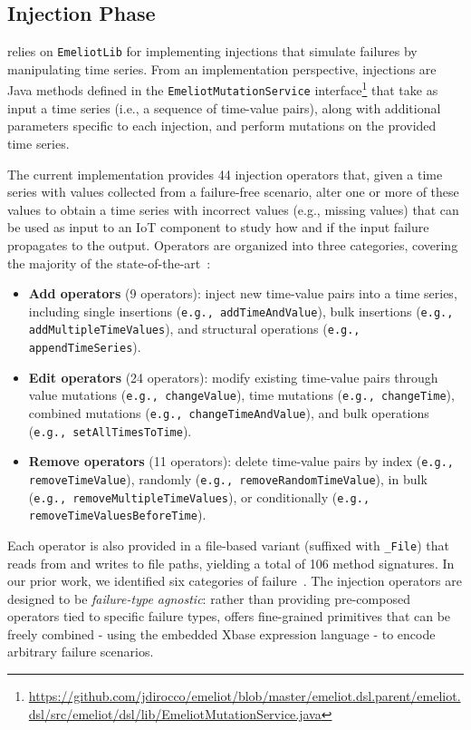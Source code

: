 \subsection{Injection Phase}
\label{sec:injection}


\tool relies on \texttt{EmeliotLib} for implementing injections that simulate failures by manipulating time series. From an implementation perspective, injections are Java methods defined in the \texttt{EmeliotMutationService} interface\footnote{\url{https://github.com/jdirocco/emeliot/blob/master/emeliot.dsl.parent/emeliot.dsl/src/emeliot/dsl/lib/EmeliotMutationService.java}} that take as input a time series (i.e., a sequence of time-value pairs), along with additional parameters specific to each injection, and perform mutations on the provided time series.

The current implementation provides 44 injection operators that, given a time series with values collected from a failure-free scenario, alter one or more of these values to obtain a time series with incorrect values (e.g., missing values) that can be used as input to an IoT component to study how and if the input failure propagates to the output.  
Operators are organized into three categories, covering the majority of the state-of-the-art~\citep{gomez-abajo_wodel-test_2021,cotroneo_profipy_2020}:
\begin{itemize}
    \item \textbf{Add operators} (9 operators): inject new time-value pairs into a time series, including single insertions (\texttt{e.g., addTimeAndValue}), bulk insertions (\texttt{e.g., addMultipleTimeValues}), and structural operations (\texttt{e.g., appendTimeSeries}).
    \item \textbf{Edit operators} (24 operators): modify existing time-value pairs through value mutations (\texttt{e.g., changeValue}), time mutations (\texttt{e.g., changeTime}), combined mutations (\texttt{e.g., changeTimeAndValue}), and bulk operations (\texttt{e.g., setAllTimesToTime}).
    \item \textbf{Remove operators} (11 operators): delete time-value pairs by index (\texttt{e.g., removeTimeValue}), randomly (\texttt{e.g., removeRandomTimeValue}), in bulk (\texttt{e.g., removeMultipleTimeValues}), or conditionally (\texttt{e.g., removeTimeValuesBeforeTime}).
\end{itemize}
Each operator is also provided in a file-based variant (suffixed with \texttt{\_File}) that reads from and writes to file paths, yielding a total of 106 method signatures. In our prior work, we identified six categories of failure~\citep{10350526}. The injection operators are designed to be \textit{failure-type agnostic}: rather than providing pre-composed operators tied to specific failure types, \tool offers fine-grained primitives that can be freely combined - using the embedded Xbase expression language - to encode arbitrary failure scenarios. %

